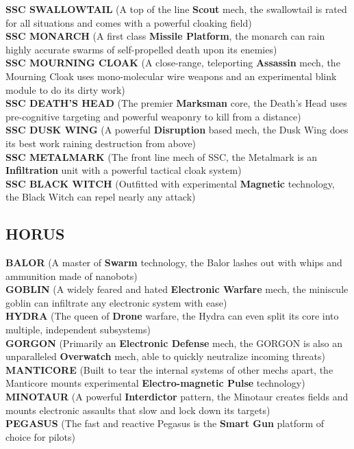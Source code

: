 \textbf{SSC SWALLOWTAIL} (A top of the line \textbf{Scout} mech, the swallowtail is rated for all situations and comes with a powerful cloaking field)\\
\textbf{SSC MONARCH} (A first class \textbf{Missile Platform}, the monarch can rain highly accurate swarms of self-propelled death upon its enemies)\\
\textbf{SSC MOURNING CLOAK} (A close-range, teleporting \textbf{Assassin} mech, the Mourning Cloak uses mono-molecular wire weapons and an experimental blink module to do its dirty work)\\
\textbf{SSC DEATH'S HEAD} (The premier \textbf{Marksman} core, the Death's Head uses pre-cognitive targeting and powerful weaponry to kill from a distance)\\
\textbf{SSC DUSK WING} (A powerful \textbf{Disruption} based mech, the Dusk Wing does its best work raining destruction from above)\\
\textbf{SSC METALMARK} (The front line mech of SSC, the Metalmark is an \textbf{Infiltration} unit with a powerful tactical cloak system)\\
\textbf{SSC BLACK WITCH} (Outfitted with experimental \textbf{Magnetic} technology, the Black Witch can repel nearly any attack)

\subsection*{HORUS}

\textbf{BALOR} (A master of \textbf{Swarm} technology, the Balor lashes out with whips and ammunition made of nanobots)\\
\textbf{GOBLIN} (A widely feared and hated \textbf{Electronic Warfare} mech, the miniscule goblin can infiltrate any electronic system with ease)\\
\textbf{HYDRA} (The queen of \textbf{Drone} warfare, the Hydra can even split its core into multiple, independent subsystems)\\
\textbf{GORGON} (Primarily an \textbf{Electronic Defense} mech, the GORGON is also an unparalleled \textbf{Overwatch} mech, able to quickly neutralize incoming threats)\\
\textbf{MANTICORE} (Built to tear the internal systems of other mechs apart, the Manticore mounts experimental \textbf{Electro-magnetic Pulse} technology)\\
\textbf{MINOTAUR} (A powerful \textbf{Interdictor} pattern, the Minotaur creates fields and mounts electronic assaults that slow and lock down its targets)\\
\textbf{PEGASUS} (The fast and reactive Pegasus is the \textbf{Smart Gun} platform of choice for pilots)

